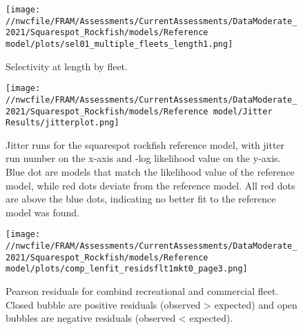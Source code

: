 \documentclass[11pt,
  english,
  a4paper,
]{article}
\begin{document}

\begin{figure}
\centering
\texttt{[image: //nwcfile/FRAM/Assessments/CurrentAssessments/DataModerate\_2021/Squarespot\_Rockfish/models/Reference model/plots/sel01\_multiple\_fleets\_length1.png]}
\caption{Selectivity at length by fleet.\label{fig:selex}}
\end{figure}

\tagmcend\tagstructend


\begin{figure}
\centering
\texttt{[image: //nwcfile/FRAM/Assessments/CurrentAssessments/DataModerate\_2021/Squarespot\_Rockfish/models/Reference model/Jitter Results/jitterplot.png]}
\caption{Jitter runs for the squarespot rockfish reference model, with jitter run number on the x-axis and -log likelihood value on the y-axis. Blue dot are models that match the likelihood value of the reference model, while red dots deviate from the reference model. All red dots are above the blue dots, indicating no better fit to the reference model was found.\label{fig:jitter_01}}
\end{figure}

\tagmcend\tagstructend


\begin{figure}
\centering
\texttt{[image: //nwcfile/FRAM/Assessments/CurrentAssessments/DataModerate\_2021/Squarespot\_Rockfish/models/Reference model/plots/comp\_lenfit\_residsflt1mkt0\_page3.png]}
\caption{Pearson residuals for combind recreational and commercial fleet. Closed bubble are positive residuals (observed \textgreater{} expected) and open bubbles are negative residuals (observed \textless{} expected).\label{fig:rec-com-pearson}}
\end{figure}
\end{document}
